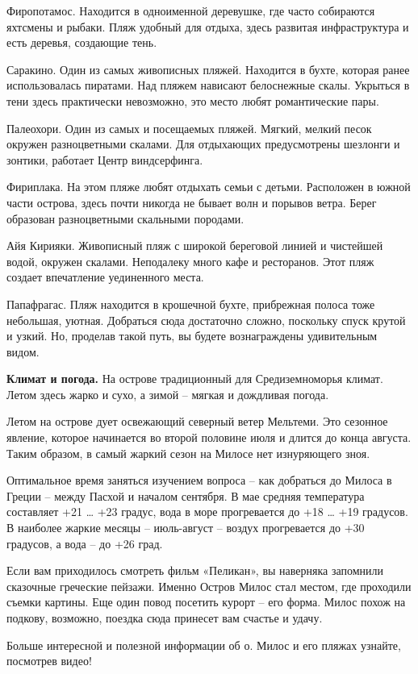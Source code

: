 Фиропотамос. Находится в одноименной деревушке, где часто собираются яхтсмены и рыбаки. Пляж удобный для отдыха, здесь развитая инфраструктура и есть деревья, создающие тень.

Саракино. Один из самых живописных пляжей. Находится в бухте, которая ранее использовалась пиратами. Над пляжем нависают белоснежные скалы. Укрыться в тени здесь практически невозможно, это место любят романтические пары.

Палеохори. Один из самых и посещаемых пляжей. Мягкий, мелкий песок окружен разноцветными скалами. Для отдыхающих предусмотрены шезлонги и зонтики, работает Центр виндсерфинга.

Фириплака. На этом пляже любят отдыхать семьи с детьми. Расположен в южной части острова, здесь почти никогда не бывает волн и порывов ветра. Берег образован разноцветными скальными породами.

Айя Кирияки. Живописный пляж с широкой береговой линией и чистейшей водой, окружен скалами. Неподалеку много кафе и ресторанов. Этот пляж создает впечатление уединенного места.

Папафрагас. Пляж находится в крошечной бухте, прибрежная полоса тоже небольшая, уютная. Добраться сюда достаточно сложно, поскольку спуск крутой и узкий. Но, проделав такой путь, вы будете вознаграждены удивительным видом.

\textbf{Климат и погода.}
На острове традиционный для Средиземноморья климат. Летом здесь жарко и сухо, а зимой – мягкая и дождливая погода.

Летом на острове дует освежающий северный ветер Мельтеми. Это сезонное явление, которое начинается во второй половине июля и длится до конца августа. Таким образом, в самый жаркий сезон на Милосе нет изнуряющего зноя.

Оптимальное время заняться изучением вопроса – как добраться до Милоса в Греции – между Пасхой и началом сентября. В мае средняя температура составляет +21 … +23 градус, вода в море прогревается до +18 … +19 градусов. В наиболее жаркие месяцы – июль-август – воздух прогревается до +30 градусов, а вода – до +26 град.

Если вам приходилось смотреть фильм «Пеликан», вы наверняка запомнили сказочные греческие пейзажи. Именно Остров Милос стал местом, где проходили съемки картины. Еще один повод посетить курорт – его форма. Милос похож на подкову, возможно, поездка сюда принесет вам счастье и удачу.

Больше интересной и полезной информации об о. Милос и его пляжах узнайте, посмотрев видео!


